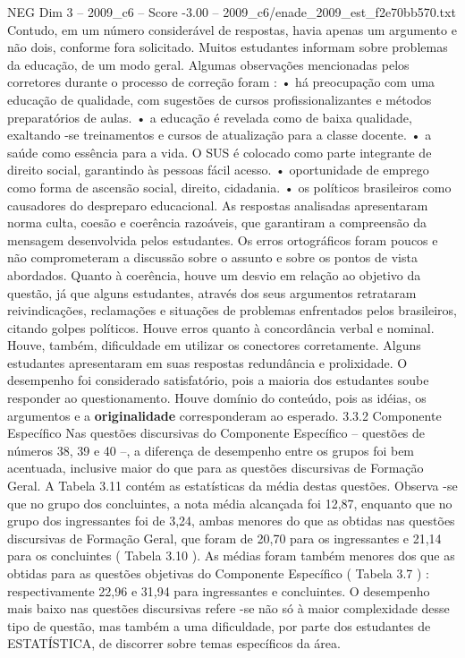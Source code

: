 \begin{textsample}{NEG Dim 3 – 2009\_c6 – Score -3.00 – 2009\_c6/enade\_2009\_est\_f2e70bb570.txt}
Contudo, em um número considerável de respostas, havia apenas um argumento e não dois, conforme fora solicitado.
Muitos estudantes informam sobre problemas da educação, de um modo geral.
Algumas observações mencionadas pelos corretores durante o processo de correção foram : • há preocupação com uma educação de qualidade, com sugestões de cursos profissionalizantes e métodos preparatórios de aulas. • a educação é revelada como de baixa qualidade, exaltando -se treinamentos e cursos de atualização para a classe docente. • a saúde como essência para a vida.
O SUS é colocado como parte integrante de direito social, garantindo às pessoas fácil acesso. • oportunidade de emprego como forma de ascensão social, direito, cidadania. • os políticos brasileiros como causadores do despreparo educacional.
As respostas analisadas apresentaram norma culta, coesão e coerência razoáveis, que garantiram a compreensão da mensagem desenvolvida pelos estudantes.
Os erros ortográficos foram poucos e não comprometeram a discussão sobre o assunto e sobre os pontos de vista abordados.
Quanto à coerência, houve um desvio em relação ao objetivo da questão, já que alguns estudantes, através dos seus argumentos retrataram reivindicações, reclamações e situações de problemas enfrentados pelos brasileiros, citando golpes políticos.
Houve erros quanto à concordância verbal e nominal.
Houve, também, dificuldade em utilizar os conectores corretamente.
Alguns estudantes apresentaram em suas respostas redundância e prolixidade.
O desempenho foi considerado satisfatório, pois a maioria dos estudantes soube responder ao questionamento.
Houve domínio do conteúdo, pois as idéias, os argumentos e a \textbf{originalidade} corresponderam ao esperado. 3.3.2 Componente Específico Nas questões discursivas do Componente Específico – questões de números 38, 39 e 40 –, a diferença de desempenho entre os grupos foi bem acentuada, inclusive maior do que para as questões discursivas de Formação Geral.
A Tabela 3.11 contém as estatísticas da média destas questões.
Observa -se que no grupo dos concluintes, a nota média alcançada foi 12,87, enquanto que no grupo dos ingressantes foi de 3,24, ambas menores do que as obtidas nas questões discursivas de Formação Geral, que foram de 20,70 para os ingressantes e 21,14 para os concluintes ( Tabela 3.10 ).
As médias foram também menores dos que as obtidas para as questões objetivas do Componente Específico ( Tabela 3.7 ) : respectivamente 22,96 e 31,94 para ingressantes e concluintes.
O desempenho mais baixo nas questões discursivas refere -se não só à maior complexidade desse tipo de questão, mas também a uma dificuldade, por parte dos estudantes de ESTATÍSTICA, de discorrer sobre temas específicos da área.

\end{textsample}
